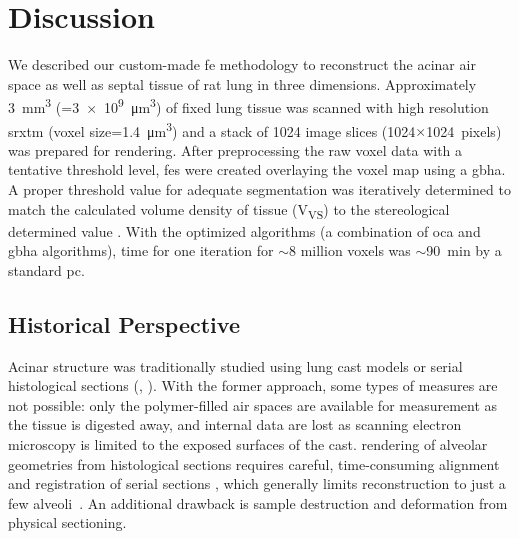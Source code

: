 \section{Discussion}\label{sec:discussion}
We described our custom-made \ac{fe} methodology to reconstruct the acinar air space as well as septal tissue of rat lung in three dimensions. Approximately \SI{3}{\milli\meter\cubed} (=\SI{3e9}{\micro\meter\cubed}) of fixed lung tissue was scanned with high resolution \ac{srxtm} (voxel size=\SI{1.4}{\micro\meter\cubed}) and a stack of 1024 image slices (1024$\times$1024~pixels) was prepared for \threed rendering. After preprocessing the raw voxel data with a tentative threshold level, \threed \acp{fe} were created overlaying the voxel map using a \ac{gbha}. A proper threshold value for adequate segmentation was iteratively determined to match the calculated volume density of tissue (V\textsubscript{VS}) to the stereological determined value \cite{Tschanz2003}. With the optimized algorithms (a combination of \ac{oca} and \ac{gbha} algorithms),  time for one iteration for $\sim$8 million voxels was $\sim$\SI{90}{\minute} by a standard \ac{pc}.

\subsection{Historical Perspective}
Acinar structure was traditionally studied using lung cast models \cite{Boyden1971,Haefeli1988,Schreider1981} or serial histological sections (\eg, \cite{Berend1991,Hansen1975,Hansen1975a,Parker1971,Randell1989}). With the former approach, some types of measures are not possible: only the polymer-filled air spaces are available for measurement as the tissue is digested away, and internal data are lost as scanning electron microscopy is limited to the exposed surfaces of the cast. \threed rendering of alveolar geometries from histological sections requires careful, time-consuming alignment and registration of serial \twod sections \cite{Mercer1987,Stelter1966}, which generally limits reconstruction to just a few alveoli~\cite{Mercer1987}. An additional drawback is sample destruction and deformation from physical sectioning.

